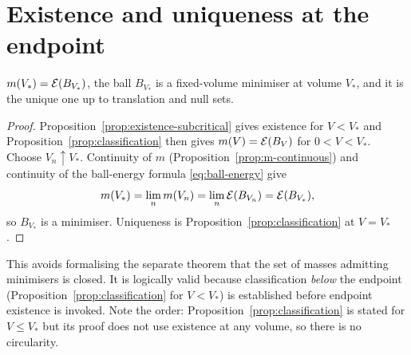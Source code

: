 \chapter{Existence and uniqueness at the endpoint}\label{ch:endpoint}

\begin{proposition}\label{prop:endpoint}
$m(V_*)=\mathcal E(B_{V_*})$, the ball $B_{V_*}$ is a fixed-volume minimiser at
volume $V_*$, and it is the unique one up to translation and null sets.
\end{proposition}

\begin{proof}
Proposition~\ref{prop:existence-subcritical} gives existence for
$V<V_*$ and Proposition~\ref{prop:classification} then gives
$m(V)=\mathcal E(B_V)$ for $0<V<V_*$.  Choose $V_n\uparrow V_*$.  Continuity of $m$
(Proposition~\ref{prop:m-continuous}) and continuity of the ball-energy
formula \eqref{eq:ball-energy} give
\[
  m(V_*)=\lim_nm(V_n)=\lim_n\mathcal E(B_{V_n})=\mathcal E(B_{V_*}),
\]
so $B_{V_*}$ is a minimiser.  Uniqueness is
Proposition~\ref{prop:classification} at $V=V_*$.
\end{proof}

\begin{remark}\label{rem:endpoint-route}
This avoids formalising the separate theorem that the set of masses admitting
minimisers is closed.  It is logically valid because classification
\emph{below} the endpoint (Proposition~\ref{prop:classification} for
$V<V_*$) is established before endpoint existence is invoked.  Note the order:
Proposition~\ref{prop:classification} is stated for $V\le V_*$ but its proof
does not use existence at any volume, so there is no circularity.
\end{remark}

